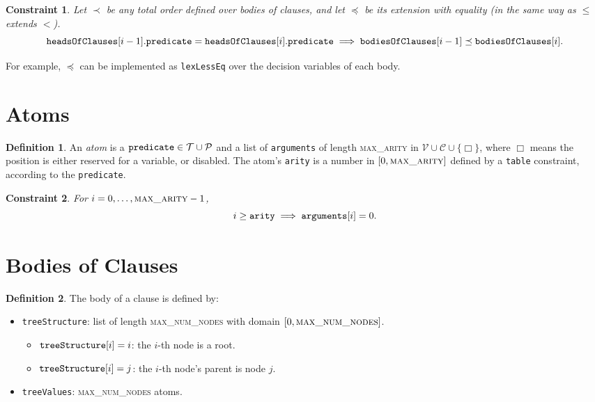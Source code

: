 \documentclass{article}
\newtheorem{constraint}{Constraint}
\theoremstyle{definition}
\newtheorem{definition}{Definition}
\newcommand{\variable}[1]{\texttt{\textup{#1}}}
\newcommand{\predicates}{\mathcal{P}}
\newcommand{\variables}{\mathcal{V}}
\newcommand{\constants}{\mathcal{C}}
\newcommand{\tokens}{\mathcal{T}}
\newcommand{\maxArity}{\textsc{max\_arity}}
\newcommand{\maxNumNodes}{\textsc{max\_num\_nodes}}
\begin{document}
\begin{constraint}
  Let $\prec$ be any total order defined over bodies of clauses, and let
  $\preceq$ be its extension with equality (in the same way as $\le$ extends
  $<$).
  \[
    \variable{headsOfClauses}[i-1].\variable{predicate} =
    \variable{headsOfClauses}[i].\variable{predicate} \implies
    \variable{bodiesOfClauses}[i-1] \preceq \variable{bodiesOfClauses}[i].
  \]
\end{constraint}
For example, $\preceq$ can be implemented as \variable{lexLessEq} over the
decision variables of each body.

\section{Atoms}

\begin{definition}
  An \emph{atom} is a $\variable{predicate} \in \tokens{} \cup \predicates{}$ and a
  list of \variable{arguments} of length \maxArity{} in $\variables{} \cup
  \constants{} \cup \{ \Box \}$, where $\Box$ means the position is either
  reserved for a variable, or disabled. The atom's \variable{arity} is a number
  in $[0, \maxArity{}]$ defined by a \variable{table} constraint,
  according to the \variable{predicate}.
\end{definition}

\begin{constraint}
  For $i = 0, \dots, \maxArity{} - 1$,
  \[
    i \ge \variable{arity} \implies \variable{arguments}[i] = 0.
  \]
\end{constraint}

\section{Bodies of Clauses}

\begin{definition}
  The body of a clause is defined by:
  \begin{itemize}
  \item \variable{treeStructure}: list of length \maxNumNodes{} with
    domain $[0, \maxNumNodes{}]$.
    \begin{itemize}
    \item $\variable{treeStructure}[i] = i$: the $i$-th node is a root.
    \item $\variable{treeStructure}[i] = j$: the $i$-th node's parent is node $j$.
    \end{itemize}
  \item \variable{treeValues}: \maxNumNodes{} atoms.
  \end{itemize}
\end{definition}
\end{document}
